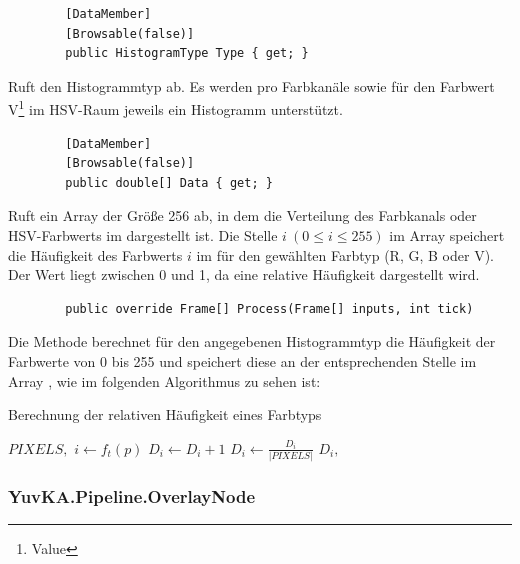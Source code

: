 \begin{itemize}
	\begin{verbatim}
		[DataMember]
		[Browsable(false)]
		public HistogramType Type { get; }
	\end{verbatim}
	Ruft den Histogrammtyp ab. Es werden pro Farbkanäle sowie für den Farbwert V\footnote{Value} im HSV-Raum jeweils ein Histogramm unterstützt.
	
	\begin{verbatim}
		[DataMember]
		[Browsable(false)]
		public double[] Data { get; }
	\end{verbatim}
	Ruft ein Array der Größe 256 ab, in dem die Verteilung des Farbkanals oder HSV-Farbwerts im  dargestellt ist. Die Stelle $ i \ (0 \leq i \leq 255) $ im Array speichert die Häufigkeit des Farbwerts $ i $ im  für den gewählten Farbtyp (R, G, B oder V). Der Wert liegt zwischen 0 und 1, da eine relative Häufigkeit dargestellt wird.

	\begin{verbatim}
		public override Frame[] Process(Frame[] inputs, int tick)
	\end{verbatim}
	Die Methode  berechnet für den angegebenen Histogrammtyp die Häufigkeit der Farbwerte von 0 bis 255 und speichert diese an der entsprechenden Stelle im Array , wie im folgenden Algorithmus zu sehen ist:
	\begin{algorithm}[H]
		\caption{Berechnung der relativen Häufigkeit eines Farbtyps}
		\begin{algorithmic}[1]
			\REQUIRE $ PIXELS, $ 
			\STATE {}
				\STATE $ i \gets f_{t}(p) $
				\STATE $ D_i \gets D_i + 1 $
			\ENDFOR
				\STATE $ D_i \gets \frac{D_i}{|PIXELS|} $
			\ENDFOR
			\ENSURE $ D_i, $ 
		\end{algorithmic}
	\end{algorithm}

\end{itemize}

\subsubsection{YuvKA.Pipeline.OverlayNode}


